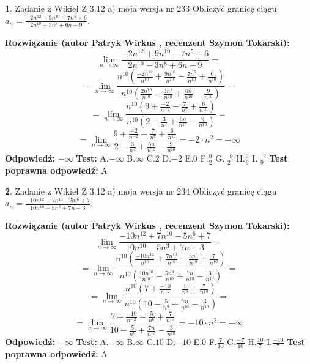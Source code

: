 \documentclass[12pt, a4paper]{article}
\theoremstyle{definition} %
\newtheorem{zad}{}
\newcommand{\zadStart}[1]{\begin{zad}#1\newline}
\newcommand{\zadStop}{\end{zad}}
\newcommand{\rozwStart}[2]{\noindent \textbf{Rozwiązanie (autor #1 , recenzent #2): }\newline}
\newcommand{\rozwStop}{\newline}
\newcommand{\odpStart}{\noindent \textbf{Odpowiedź:}\newline}
\newcommand{\odpStop}{\newline}
\newcommand{\testStart}{\noindent \textbf{Test:}\newline}
\newcommand{\testStop}{\newline}
\newcommand{\kluczStart}{\noindent \textbf{Test poprawna odpowiedź:}\newline}
\newcommand{\kluczStop}{\newline}
\begin{document}
\zadStart{Zadanie z Wikieł Z 3.12 a) moja wersja nr 233}
Obliczyć granicę ciągu $a_{n}=\frac{-2n^{12}+9n^{10}-7n^{5}+6}{2n^{10}-3n^{8}+6n-9}$.
\zadStop
\rozwStart{Patryk Wirkus}{Szymon Tokarski}
$$\lim\limits_{n\to\infty}\frac{-2n^{12}+9n^{10}-7n^{5}+6}{2n^{10}-3n^{8}+6n-9}=$$
$$=\lim\limits_{n\to\infty}\frac{n^{10}\left(\frac{-2n^{12}}{n^{10}}+\frac{9n^{10}}{n^{10}}-\frac{7n^{5}}{n^{10}}+\frac{6}{n^{10}}\right)}{n^{10}\left(\frac{2n^{10}}{n^{10}}-\frac{3n^{8}}{n^{10}}+\frac{6n}{n^{10}}-\frac{9}{n^{10}}\right)}=$$
$$=\lim\limits_{n\to\infty}\frac{n^{10}\left(9+\frac{-2}{n^{-2}}-\frac{7}{n^{7}}+\frac{6}{n^{10}}\right)}
{n^{10}\left(2-\frac{3}{n^{4}}+\frac{6n}{n^{10}}-\frac{9}{n^{10}}\right)}=$$
$$=\lim\limits_{n\to\infty}\frac{9+\frac{-2}{n^{-2}}-\frac{7}{n^{7}}+\frac{6}{n^{10}}}{2-\frac{3}{n^{4}}+\frac{6n}{n^{10}}-\frac{9}{n^{10}}}=-2\cdot n^{2} = -\infty$$
\rozwStop
\odpStart
$-\infty$
\odpStop
\testStart
A.$-\infty$
B.$\infty$
C.$2$
D.$-2$
E.$0$
F.$\frac{9}{2}$
G.$\frac{-9}{2}$
H.$\frac{2}{9}$
I.$\frac{-2}{9}$
\testStop
\kluczStart
A
\kluczStop



\zadStart{Zadanie z Wikieł Z 3.12 a) moja wersja nr 234}
Obliczyć granicę ciągu $a_{n}=\frac{-10n^{12}+7n^{10}-5n^{6}+7}{10n^{10}-5n^{3}+7n-3}$.
\zadStop
\rozwStart{Patryk Wirkus}{Szymon Tokarski}
$$\lim\limits_{n\to\infty}\frac{-10n^{12}+7n^{10}-5n^{6}+7}{10n^{10}-5n^{3}+7n-3}=$$
$$=\lim\limits_{n\to\infty}\frac{n^{10}\left(\frac{-10n^{12}}{n^{10}}+\frac{7n^{10}}{n^{10}}-\frac{5n^{6}}{n^{10}}+\frac{7}{n^{10}}\right)}{n^{10}\left(\frac{10n^{10}}{n^{10}}-\frac{5n^{3}}{n^{10}}+\frac{7n}{n^{10}}-\frac{3}{n^{10}}\right)}=$$
$$=\lim\limits_{n\to\infty}\frac{n^{10}\left(7+\frac{-10}{n^{-2}}-\frac{5}{n^{6}}+\frac{7}{n^{10}}\right)}
{n^{10}\left(10-\frac{5}{n^{9}}+\frac{7n}{n^{10}}-\frac{3}{n^{10}}\right)}=$$
$$=\lim\limits_{n\to\infty}\frac{7+\frac{-10}{n^{-2}}-\frac{5}{n^{6}}+\frac{7}{n^{10}}}{10-\frac{5}{n^{9}}+\frac{7n}{n^{10}}-\frac{3}{n^{10}}}=-10\cdot n^{2} = -\infty$$
\rozwStop
\odpStart
$-\infty$
\odpStop
\testStart
A.$-\infty$
B.$\infty$
C.$10$
D.$-10$
E.$0$
F.$\frac{7}{10}$
G.$\frac{-7}{10}$
H.$\frac{10}{7}$
I.$\frac{-10}{7}$
\testStop
\kluczStart
A
\kluczStop
\end{document}
